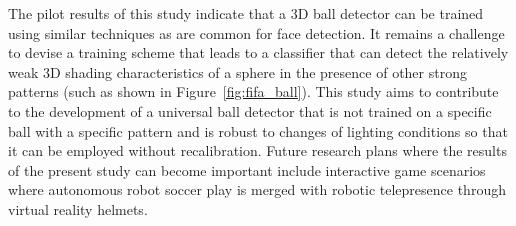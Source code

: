 \documentclass{sig-alternate-05-2015}
\begin{document}
{    The pilot results of this study indicate that a 3D ball detector can be trained using similar techniques as are common for face detection. It remains a challenge to devise a training scheme that leads to a classifier that can detect the relatively weak 3D shading characteristics of a sphere in the presence of other strong patterns (such as shown in Figure~\ref{fig:fifa_ball}). This study aims to contribute to the development of a universal ball detector that is not trained on a specific ball with a specific pattern and is robust to changes of lighting conditions so that it can be employed without recalibration. Future research plans where the results of the present study can become important include interactive game scenarios where autonomous robot soccer play is merged with robotic telepresence through virtual reality helmets. 
}

\balance

	
\end{document}
